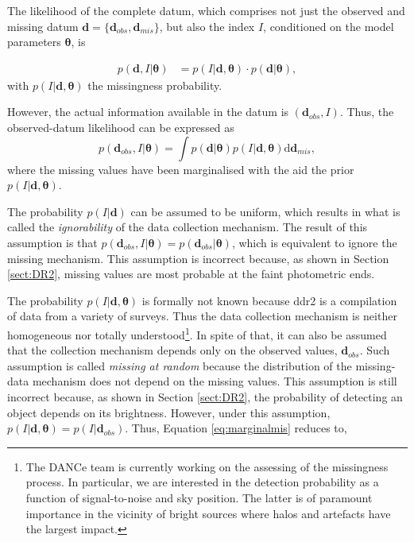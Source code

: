The likelihood of the complete datum, which comprises not just the observed and missing datum $\mathbf{d}=\{\mathbf{d}_{obs},\mathbf{d}_{mis}\}$, but also the index $I$, conditioned on the model parameters $\boldsymbol{\theta}$, is

\begin{align}
p(\mathbf{d},I|\boldsymbol{\theta})&=p(I|\mathbf{d},\boldsymbol{\theta})\cdot p(\mathbf{d}|\boldsymbol{\theta}), \nonumber
\end{align}
with $p(I|\mathbf{d},\boldsymbol{\theta})$ the missingness probability.

However, the actual information available in the datum is $(\mathbf{d}_{obs},I)$. Thus, the observed-datum likelihood can be expressed as
\begin{equation}
\label{eq:marginalmis}
p(\mathbf{d}_{obs},I|\boldsymbol{\theta})=\int p(\mathbf{d}|\boldsymbol{\theta})p(I|\mathbf{d},\boldsymbol{\theta})\mathrm{d}\mathbf{d}_{mis},
\end{equation}
where the missing values have been marginalised with the aid the prior $p(I|\mathbf{d},\boldsymbol{\theta})$. 

The probability $p(I|\mathbf{d})$ can be assumed to be uniform, which results in what is called the \emph{ignorability} of the data collection mechanism. The result of this assumption is that $p(\mathbf{d}_{obs},I|\boldsymbol{\theta})= p(\mathbf{d}_{obs}|\boldsymbol{\theta})$, which is equivalent to ignore the missing mechanism. This assumption is incorrect because, as shown in Section \ref{sect:DR2}, missing values are most probable at the faint photometric ends.

The probability $p(I|\mathbf{d},\boldsymbol{\theta})$ is formally not known because \gls{ddr2} is a compilation of data from a variety of surveys. Thus the data collection mechanism is neither homogeneous nor totally understood\footnote{ The DANCe team is currently working on the assessing of the missingness process. In particular, we are interested in the detection probability as a function of signal-to-noise and sky position. The latter is of paramount importance in the vicinity of bright sources where halos and artefacts have the largest impact.}. In spite of that, it can also be assumed that the collection mechanism depends only on the observed values, $\mathbf{d}_{obs}$. Such assumption is called \emph{missing at random} \cite[][p. 450]{Gelman2013} because the distribution of the missing-data mechanism does not depend on the missing values. This assumption is still incorrect because, as shown in Section \ref{sect:DR2},  the probability of detecting an object depends on its brightness. However, under this assumption, $p(I|\mathbf{d},\boldsymbol{\theta})=p(I|\mathbf{d}_{obs})$. Thus, Equation \ref{eq:marginalmis} reduces to,

